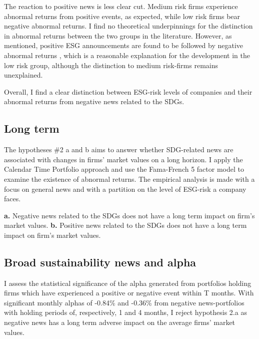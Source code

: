 The reaction to positive news is less clear cut. Medium risk firms experience abnormal returns from positive events, as expected, while low risk firms bear negative abnormal returns. I find no theoretical underpinnings for the distinction in abnormal returns between the two groups in the literature. However, as mentioned, positive ESG announcements are found to be followed by negative abnormal returns \cite{fisher2011voluntary}, which is a reasonable explanation for the development in the low risk group, although the distinction to medium risk-firms remains unexplained.  

Overall, I find a clear distinction between ESG-risk levels of companies and their abnormal returns from negative news related to the SDGs. 



\subsection{Long term}

The hypotheses \#2 a and b aims to answer whether SDG-related news are associated with changes in firms' market values on a long horizon. I apply the Calendar Time Portfolio approach and use the Fama-French 5 factor model to examine the existence of abnormal returns. The empirical analysis is made with a focus on general news and with a partition on the level of ESG-risk a company faces.  

\textbf{a.}  Negative news related to the SDGs does not have a long term impact on firm's market values.
\textbf{b.}  Positive news related to the SDGs does not have a long term impact on firm's market values.

\subsection{Broad sustainability news and alpha}

I assess the statistical significance of the alpha generated from portfolios holding firms which have experienced a positive or negative event within T months. With significant monthly alphas of -0.84\% and -0.36\% from negative news-portfolios with holding periods of, respectively, 1 and 4 months, I reject hypothesis 2.a as negative news has a long term adverse impact on the average firms' market values.   

